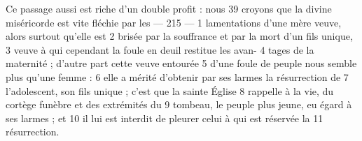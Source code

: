 Ce passage aussi est riche d'un double profit : nous	 
39	 	croyons que la divine miséricorde est vite fléchie par les	 
 	--- 215 ---	 
1	 	lamentations d'une mère veuve, alors surtout qu'elle est	 
2	 	brisée par la souffrance et par la mort d'un fils unique,	 
3	 	veuve à qui cependant la foule en deuil restitue les avan-	 
4	 	tages de la maternité ; d'autre part cette veuve entourée	 
5	 	d'une foule de peuple nous semble plus qu'une femme :	 
6	 	elle a mérité d'obtenir par ses larmes la résurrection de	 
7	 	l'adolescent, son fils unique ; c'est que la sainte Église	 
8	 	rappelle à la vie, du cortège funèbre et des extrémités du	 
9	 	tombeau, le peuple plus jeune, eu égard à ses larmes ; et	 
10	 	il lui est interdit de pleurer celui à qui est réservée la	 
11	 	résurrection.